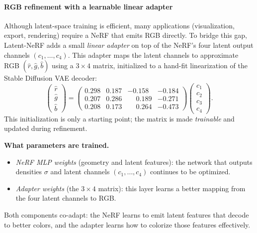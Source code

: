 \begin{enrichment}
\begin{enrichment}
        \paragraph{RGB refinement with a learnable linear adapter}
        Although latent-space training is efficient, many applications (visualization, export, rendering) require a NeRF that emits RGB directly. To bridge this gap, Latent-NeRF adds a small \emph{linear adapter} on top of the NeRF’s four latent output channels $(c_1,\ldots,c_4)$. This adapter maps the latent channels to approximate RGB $(\hat r,\hat g,\hat b)$ using a $3{\times}4$ matrix, initialized to a hand-fit linearization of the Stable Diffusion VAE decoder:
        \begin{equation}
            \begin{pmatrix}\hat r\\[2pt]\hat g\\[2pt]\hat b\end{pmatrix}
            =
            \begin{pmatrix}
                0.298 & 0.187 & -0.158 & -0.184\\
                0.207 & 0.286 & \phantom{-}0.189 & -0.271\\
                0.208 & 0.173 & \phantom{-}0.264 & -0.473
            \end{pmatrix}
            \begin{pmatrix}c_1\\[2pt]c_2\\[2pt]c_3\\[2pt]c_4\end{pmatrix}.
            \label{eq:chapter23_latentnerf_eq3}
        \end{equation}
        This initialization is only a starting point; the matrix is made \emph{trainable} and updated during refinement.
        
        \textbf{What parameters are trained.}
        \begin{itemize}
            \item \emph{NeRF MLP weights} (geometry and latent features): the network that outputs densities $\sigma$ and latent channels $(c_1,\ldots,c_4)$ continues to be optimized.
            \item \emph{Adapter weights} (the $3{\times}4$ matrix): this layer learns a better mapping from the four latent channels to RGB.
        \end{itemize}
        Both components co-adapt: the NeRF learns to emit latent features that decode to better colors, and the adapter learns how to colorize those features effectively.
        

\end{enrichment}
\end{enrichment}
